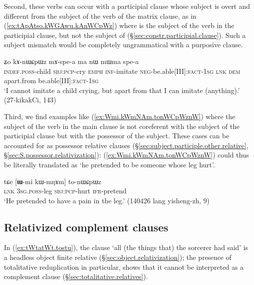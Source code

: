 Second, these verbs can occur with a participial clause whose subject is overt and different from the subject of the verb of the matrix clause, as in (\ref{ex:tApAtso.kWGAwu.kAnWCpWz}) where   is the subject of the verb  in the participial clause, but not the subject of   (§\ref{sec:constr.participial.clause}). Such a subject mismatch would be completely ungrammatical with a purposive clause.
 
\begin{exe}
\ex \label{ex:tApAtso.kWGAwu.kAnWCpWz}
  ʑo kɤ-nɯɕpɯz mɤ-spe-a ma nɯ mɯma spe-a \\
 \textsc{indef}.\textsc{poss}-child \textsc{sbj}:\textsc{pcp}-cry \textsc{emph} \textsc{inf}-imitate \textsc{neg}-be.able[III]:\textsc{fact}-\textsc{1sg} \textsc{lnk} \textsc{dem} apart.from be.able[III]:\textsc{fact}-\textsc{1sg} \\
\glt `I cannot imitate a child crying, but apart from that I can imitate (anything).' (27-kikakCi, 143)
\end{exe}

Third, we find examples like (\ref{ex:Wmi.kWmNAm.tonWCpWznW}) where the subject of the verb in the main clause is not coreferent with the subject of the participial clause but with the possessor of the subject. These cases can be accounted for as possessor relative clauses (§\ref{sec:subject.participle.other.relative}, §\ref{sec:S.possessor.relativization}):  (\ref{ex:Wmi.kWmNAm.tonWCpWznW}) could thus be literally translated as `he pretended to be someone whose leg hurt'.

\begin{exe}
\ex \label{ex:Wmi.kWmNAm.tonWCpWznW}
 \gll  tɕe [\textbf{ɯ}-mi kɯ-mŋɤm] to-nɯɕpɯz  \\
 \textsc{lnk} \textsc{3sg}.\textsc{poss}-leg \textsc{sbj}:\textsc{pcp}-hurt \textsc{ifr}-pretend \\
 \glt `He pretended to have a pain in the leg.' (140426 lang yisheng-zh, 9)
\end{exe}

 \subsection{Relativized complement clauses}  \label{sec:relativized.complement.clause}
In (\ref{ex:tWtatWt.tostu}),  the clause  `all (the things that) the sorcerer had said' is a headless object finite relative (§\ref{sec:object.relativization}); the presence of totalitative reduplication in particular, shows that it cannot be interpreted as a complement clause (§\ref{sec:totalitative.relatives}).

